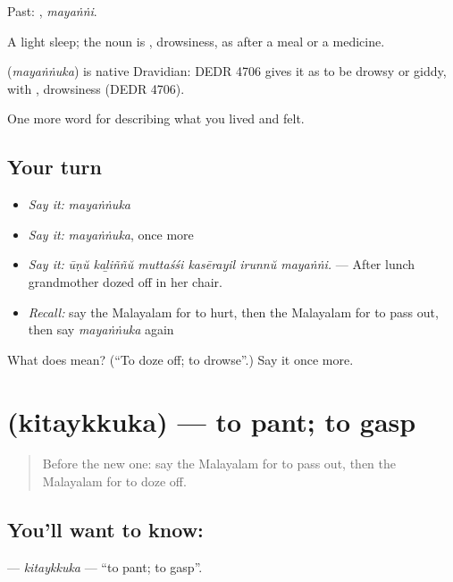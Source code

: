 Past: , \emph{mayaṅṅi}.

A light sleep; the noun is , drowsiness, as after a meal or a medicine.

\begin{cousinweb}
\textbf{} (\emph{mayaṅṅuka}) is native Dravidian: DEDR 4706 gives it as to be drowsy or giddy, with , drowsiness (DEDR 4706).
\end{cousinweb}

\begin{grammarlens}[title={What you've built}]
One more word for describing what you lived and felt.
\end{grammarlens}

\subsection*{Your turn}
\begin{itemize}
\raggedright
  \item \emph{Say it:} \emph{mayaṅṅuka}
  \item \emph{Say it:} \emph{mayaṅṅuka}, once more
  \item \emph{Say it:} \emph{ūṇŭ kaḻiññŭ muttaśśi kasērayil irunnŭ mayaṅṅi.} — After lunch grandmother dozed off in her chair.
  \item \emph{Recall:} say the Malayalam for to hurt, then the Malayalam for to pass out, then say \emph{mayaṅṅuka} again
\end{itemize}

\begin{tcolorbox}[breakable,colback=teal!4,colframe=teal!35!black,title={Before you move on}]
What does  mean? (\textquotedblleft{}To doze off; to drowse\textquotedblright{}.) Say it once more.
\end{tcolorbox}
\section[\texorpdfstring{\ml{കിതയ്ക്കുക} (kitaykkuka)}{കിതയ്ക്കുക (kitaykkuka)}]{ (kitaykkuka) — to pant; to gasp}

\label{lesson:ML-C539-kitaykkuka}



\begin{quote}
Before the new one: say the Malayalam for to pass out, then the Malayalam for to doze off.
\end{quote}

\subsection*{You'll want to know: }
\textbf{} — \emph{kitaykkuka} — \textquotedblleft{}to pant; to gasp\textquotedblright{}.

